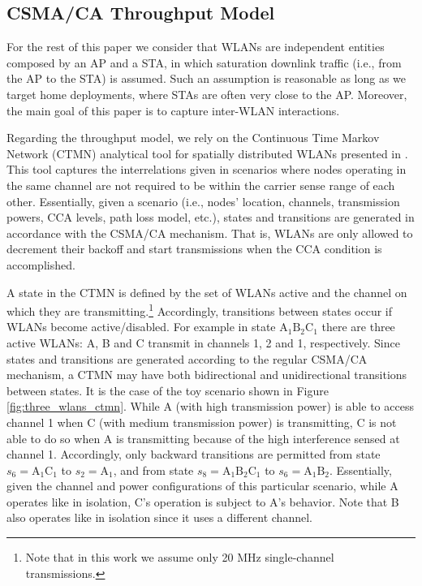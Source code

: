 \documentclass[preprint,12pt]{elsarticle}
\begin{document}
\subsection{CSMA/CA Throughput Model}
\label{section:throughput_model}		
For the rest of this paper we consider that WLANs are independent entities composed by an AP and a STA, in which saturation downlink traffic (i.e., from the AP to the STA) is assumed. Such an assumption is  reasonable as long as we target home deployments, where STAs are often very close to the AP. Moreover, the main goal of this paper is to capture inter-WLAN interactions.

Regarding the throughput model, we rely on the Continuous Time Markov Network (CTMN) analytical tool for spatially distributed WLANs presented in \cite{barrachina2018performance}. This tool captures the interrelations given in scenarios where nodes operating in the same channel are not required to be within the carrier sense range of each other. Essentially, given a scenario (i.e., nodes' location, channels, transmission powers, CCA levels, path loss model, etc.), states and transitions are generated in accordance with the CSMA/CA mechanism. That is, WLANs are only allowed to decrement their backoff and start transmissions when the CCA condition is accomplished.

A state in the CTMN is defined by the set of WLANs active and the channel on which they are transmitting.\footnote{Note that in this work we assume only 20 MHz single-channel transmissions.} Accordingly, transitions between states occur if WLANs become active/disabled. For example in state $\text{A}_1 \text{B}_2 \text{C}_1$ there are three active WLANs: A, B and C transmit in channels 1, 2 and 1, respectively. Since states and transitions are generated according to the regular CSMA/CA mechanism, a CTMN may have both bidirectional and unidirectional transitions between states. It is the case of the toy scenario shown in Figure \ref{fig:three_wlans_ctmn}. While A (with high transmission power) is able to access channel 1 when C (with medium transmission power) is transmitting, C is not able to do so when A is transmitting because of the high interference sensed at channel 1. Accordingly, only backward transitions are permitted from state $s_6 = \text{A}_1 \text{C}_1$ to $s_2 = \text{A}_1$, and from state $s_8 = \text{A}_1 \text{B}_2 \text{C}_1$ to $s_6 = \text{A}_1 \text{B}_2$. Essentially, given the channel and power configurations of this particular scenario, while A operates like in isolation, C's operation is subject to A's behavior. Note that B also operates like in isolation since it uses a different channel.
\end{document}
